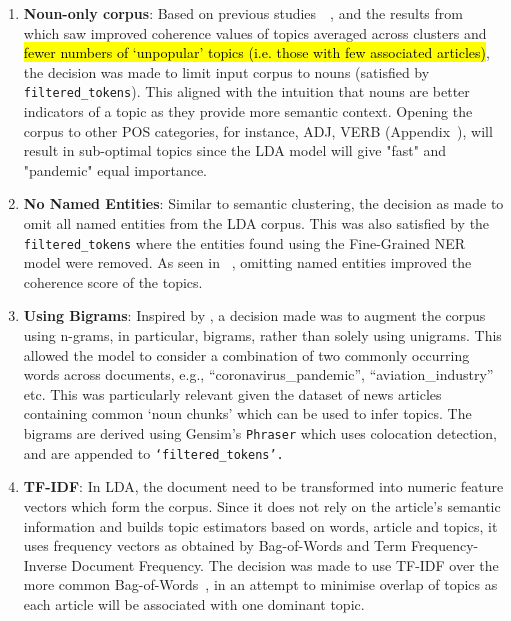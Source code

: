 \begin{enumerate}
  \item \textbf{Noun-only corpus}: Based on previous studies~\cite{nouns_only_lda}~\cite{efficient_noun_only_approach}, and the results from~ which saw improved coherence values of topics averaged across clusters and \hl{fewer numbers of `unpopular' topics (i.e. those with few associated articles)}, the decision was made to limit input corpus to nouns (satisfied by \texttt{filtered\_tokens}). This aligned with the intuition that nouns are better indicators of a topic as they provide more semantic context. Opening the corpus to other POS categories, for instance, ADJ, VERB (Appendix~), will result in sub-optimal topics since the LDA model will give "fast" and "pandemic" equal importance.
  
  \item \textbf{No Named Entities}: Similar to semantic clustering, the decision as made to omit all named entities from the LDA corpus. This was also satisfied by the \texttt{filtered\_tokens} where the entities found using the Fine-Grained NER model were removed. As seen in ~, omitting named entities improved the coherence score of the topics. 

  \item \textbf{Using Bigrams}: Inspired by \cite[`Beyond bag of words']{bigrams_lda}, a decision made was to augment the corpus using n-grams, in particular, bigrams, rather than solely using unigrams. This allowed the model to consider a combination of two commonly occurring words across documents, e.g., “coronavirus\_pandemic”, “aviation\_industry” etc. This was particularly relevant given the dataset of news articles containing common `noun chunks' which can be used to infer topics. The bigrams are derived using Gensim's \texttt{Phraser} which uses colocation detection, and are appended to \texttt{‘filtered\_tokens’.}
  
  \item \textbf{TF-IDF}: In LDA, the document need to be transformed into numeric feature vectors which form the corpus. Since it does not rely on the article's semantic information and builds topic estimators based on words, article and topics, it uses frequency vectors as obtained by Bag-of-Words and Term Frequency-Inverse Document Frequency. The decision was made to use TF-IDF over the more common Bag-of-Words~\cite{topic_models}, in an attempt to minimise overlap of topics as each article will be associated with one dominant topic.
\end{enumerate}

